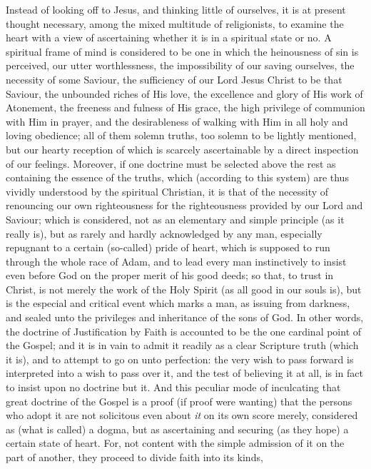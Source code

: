 Instead of looking off to Jesus, and thinking little of ourselves, it
is at present thought necessary, among the mixed multitude of
religionists, to examine the heart with a view of ascertaining whether
it is in a spiritual state or no. A spiritual frame of mind is
considered to be one in which the heinousness of sin is perceived, our
utter worthlessness, the impossibility of our saving ourselves, the
necessity of some Saviour, the sufficiency of our Lord Jesus Christ to
be that Saviour, the unbounded riches of His love, the excellence and
glory of His work of Atonement, the freeness and fulness of His grace,
the high privilege of communion with Him in prayer, and the
desirableness of walking with Him in all holy and loving obedience; all
of them solemn truths, too solemn to be lightly mentioned, but our
hearty reception of which is scarcely ascertainable by a direct
inspection of our feelings. Moreover, if one doctrine must be selected
above the rest as containing the essence of the truths, which (according
to this system) are thus vividly understood by the spiritual Christian,
it is that of the necessity of renouncing our own righteousness for the
righteousness provided by our Lord and Saviour; which is considered, not
as an elementary and simple principle (as it really is), but as rarely
and hardly acknowledged by any man, especially repugnant to a certain
(so-called) pride of heart, which is supposed to run through the whole
race of Adam, and to lead every man instinctively to insist even before
God on the proper merit of his good deeds; so that, to trust in Christ,
is not merely the work of the Holy Spirit (as all good in our souls is),
but is the especial and critical event which marks a man, as issuing
from darkness, and sealed unto the privileges and inheritance of the
sons of God. In other words, the doctrine of Justification by Faith is
accounted to be the one cardinal point of the Gospel; and it is in vain
to admit it readily as a clear Scripture truth (which it is), and to
attempt to go on unto perfection: the very wish to pass forward is
interpreted into a wish to pass over it, and the test of believing it at
all, is in fact to insist upon no doctrine but it. And this peculiar
mode of inculcating that great doctrine of the Gospel is a proof (if
proof were wanting) that the persons who adopt it are not solicitous
even about \emph{it} on its own score merely, considered as (what is
called) a dogma, but as ascertaining and securing (as they hope) a
certain state of heart. For, not content with the simple admission of it
on the part of another, they proceed to divide faith into its kinds,
